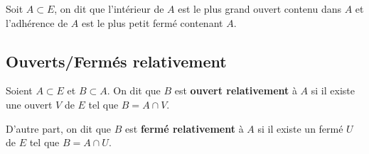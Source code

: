 \begin{proposition}
    Soit $A \subset E$, on dit que l'intérieur de $A$ est le plus grand ouvert contenu dans $A$ et 
    l'adhérence de $A$ est le plus petit fermé contenant $A$. 
\end{proposition}

\subsection{Ouverts/Fermés relativement}

\begin{definition}
    Soient $A \subset E$ et $B \subset A$. On dit que $B$ est \textbf{ouvert relativement} à $A$ si il existe 
    une ouvert $V$ de $E$ tel que $B = A \cap V$. 

    D'autre part, on dit que $B$ est \textbf{fermé relativement} à $A$ si il existe un fermé 
    $U$ de $E$ tel que $B = A \cap U$. 
\end{definition}

